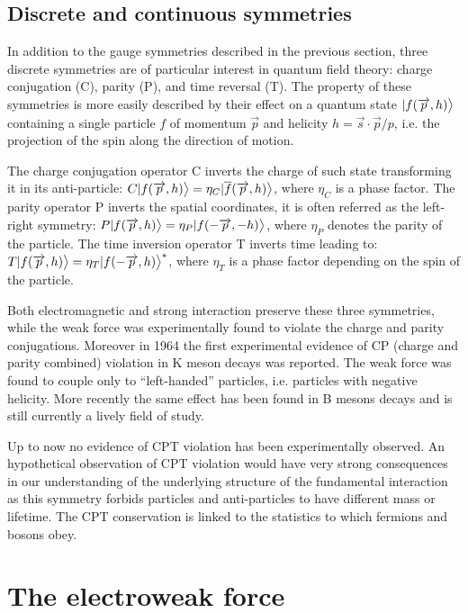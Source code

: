 \subsection{Discrete and continuous symmetries}

In addition to the gauge symmetries described in the previous section, three discrete symmetries are of particular interest in quantum field theory: charge conjugation (C), parity (P), and time reversal (T). The property of these symmetries is more easily described by their effect on a quantum state $|f(\overrightarrow{p}, h)\big{>}$ containing a single particle $f$ of momentum $\vec{p}$ and helicity $h = \vec{s} \cdot \vec{p} / p$, i.e. the projection of the spin along the direction of motion.

The charge conjugation operator C inverts the charge of such state transforming it in its anti-particle: $C|f(\overrightarrow{p}, h)\big{>} = \eta_C|\overline{f}(\overrightarrow{p}, h)\big{>}$, where $\eta_C$ is a phase factor. The parity operator P inverts the spatial coordinates, it is often referred as the left-right symmetry: $P|f(\overrightarrow{p}, h)\big{>} = \eta_P|f(-\overrightarrow{p}, -h)\big{>}$, where $\eta_P$ denotes the parity of the particle. The time inversion operator T inverts time leading to: $T|f(\overrightarrow{p}, h)\big{>} = \eta_T|f(-\overrightarrow{p}, h)\big{>}^*$, where $\eta_T$ is a phase factor depending on the spin of the particle.

Both electromagnetic and strong interaction preserve these three symmetries, while the weak force was experimentally found to violate the charge and parity conjugations. Moreover in 1964 the first experimental evidence of CP (charge and parity combined) violation in K meson decays \cite{PhysRevLett.13.138} was reported. The weak force was found to couple only to ``left-handed'' particles, i.e. particles with negative helicity. More recently the same effect has been found in B mesons decays and is still currently a lively field of study. 

Up to now no evidence of CPT violation has been experimentally observed. An hypothetical observation of CPT violation would have very strong consequences in our understanding of the underlying structure of the fundamental interaction as this symmetry forbids particles and anti-particles to have different mass or lifetime. The CPT conservation is linked to the statistics to which fermions and bosons obey.

\section{The electroweak force}

